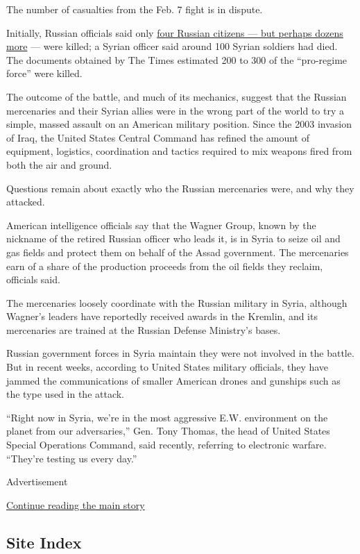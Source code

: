 The number of casualties from the Feb. 7 fight is in dispute.

Initially, Russian officials said only
\href{https://www.nytimes.com/2018/02/13/world/europe/russia-syria-dead.html}{four
Russian citizens --- but perhaps dozens more} --- were killed; a Syrian
officer said around 100 Syrian soldiers had died. The documents obtained
by The Times estimated 200 to 300 of the ``pro-regime force'' were
killed.

The outcome of the battle, and much of its mechanics, suggest that the
Russian mercenaries and their Syrian allies were in the wrong part of
the world to try a simple, massed assault on an American military
position. Since the 2003 invasion of Iraq, the United States Central
Command has refined the amount of equipment, logistics, coordination and
tactics required to mix weapons fired from both the air and ground.

Questions remain about exactly who the Russian mercenaries were, and why
they attacked.

American intelligence officials say that the Wagner Group, known by the
nickname of the retired Russian officer who leads it, is in Syria to
seize oil and gas fields and protect them on behalf of the Assad
government. The mercenaries earn of a share of the production proceeds
from the oil fields they reclaim, officials said.

The mercenaries loosely coordinate with the Russian military in Syria,
although Wagner's leaders have reportedly received awards in the
Kremlin, and its mercenaries are trained at the Russian Defense
Ministry's bases.

Russian government forces in Syria maintain they were not involved in
the battle. But in recent weeks, according to United States military
officials, they have jammed the communications of smaller American
drones and gunships such as the type used in the attack.

``Right now in Syria, we're in the most aggressive E.W. environment on
the planet from our adversaries,'' Gen. Tony Thomas, the head of United
States Special Operations Command, said recently, referring to
electronic warfare. ``They're testing us every day.''

Advertisement

\protect\hyperlink{after-bottom}{Continue reading the main story}

\hypertarget{site-index}{%
\subsection{Site Index}\label{site-index}}

